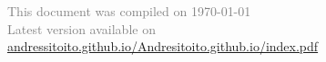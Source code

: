 \documentclass{resume} %
\begin{document}






\begin{flushright}
\end{flushright} 
\textcolor{gray}{This document was compiled on \today\\ Latest version available on \href{https://andressitoito.github.io/Andresitoito.github.io/index.pdf}{andressitoito.github.io/Andresitoito.github.io/index.pdf}}
\end{document}
